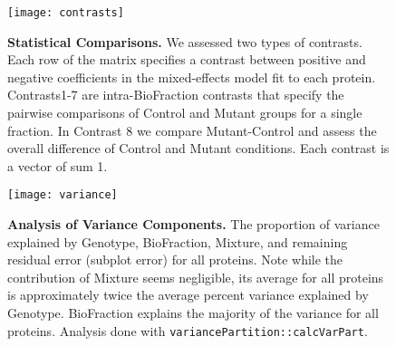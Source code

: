 \newpage


\begin{figure}[h] %
  \begin{fullwidth}
  \begin{center}
	  \texttt{[image: contrasts]}
	  \caption{\textbf{Statistical Comparisons.} We assessed two types of
	  contrasts. Each row of the matrix specifies a contrast between
	  positive and negative coefficients in the mixed-effects model fit to
	  each protein. Contrasts1-7 are intra-BioFraction contrasts that
	  specify the pairwise comparisons of Control and Mutant groups for a
	  single fraction. In Contrast 8 we compare Mutant-Control and assess
	  the overall difference of Control and Mutant conditions.  Each
	  contrast is a vector of sum 1.}
	  \label{fig:contrasts}
  \end{center}
  \end{fullwidth}
\end{figure}

\newpage


\begin{figure}[h] %
  \begin{fullwidth}
  \begin{center}
	  \texttt{[image: variance]}
	  \caption{\textbf{Analysis of Variance Components.} 
	  The proportion of variance explained by Genotype, BioFraction,
	  Mixture, and remaining residual error (subplot error) for all
	  proteins. Note while the contribution of Mixture seems negligible,
	  its average for all proteins is approximately twice the average
	  percent variance explained by Genotype. BioFraction explains the
	  majority of the variance for all proteins. Analysis done with
	  \texttt{variancePartition::calcVarPart}.}
	  \label{fig:variance}
  \end{center}
  \end{fullwidth}
\end{figure}

\newpage
